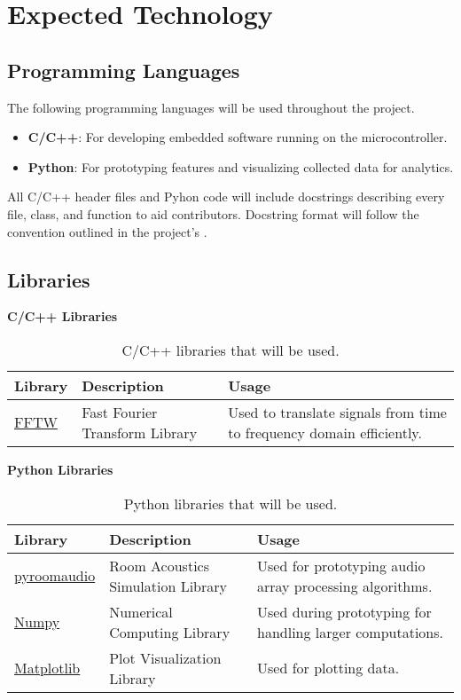 \documentclass{article}
\begin{document}
\section{Expected Technology}

\subsection{Programming Languages}
The following programming languages will be used throughout the project.
\begin{itemize}
  \item \textbf{C/C++}: For developing embedded software running on the microcontroller.
  \item \textbf{Python}: For prototyping features and visualizing collected data for analytics.
\end{itemize}

All C/C++ header files and Pyhon code will include docstrings describing every file, class, and function to aid contributors.
Docstring format will follow the convention outlined in the project's .

\subsection{Libraries}

\textbf{C/C++ Libraries}
\begin{table}[h!]
\centering
\begin{tabularx}{\textwidth}{|l|X|X|}
\hline
\textbf{Library} & \textbf{Description} & \textbf{Usage} \\ \hline
\href{https://www.fftw.org/}{FFTW} & Fast Fourier Transform Library & Used to translate signals from time to frequency domain efficiently. \\ \hline
\end{tabularx}
\caption{C/C++ libraries that will be used.}
\end{table}

\textbf{Python Libraries}
\begin{table}[h!]
\centering
\begin{tabularx}{\textwidth}{|l|X|X|}
\hline
\textbf{Library} & \textbf{Description} & \textbf{Usage} \\ \hline
\href{https://pypi.org/project/pyroomacoustics/}{pyroomaudio} & Room Acoustics Simulation Library  & Used for prototyping audio array processing algorithms. \\ \hline
\href{https://numpy.org/}{Numpy} & Numerical Computing Library  & Used during prototyping for handling larger computations. \\ \hline
\href{https://matplotlib.org/}{Matplotlib} & Plot Visualization Library  & Used for plotting data. \\ \hline
\end{tabularx}
\caption{Python libraries that will be used.}
\end{table}
\end{document}
